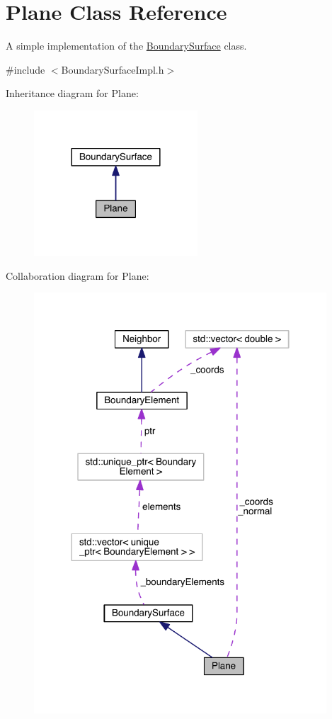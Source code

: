\hypertarget{classPlane}{\section{Plane Class Reference}
\label{classPlane}
}


A simple implementation of the \hyperlink{classBoundarySurface}{Boundary\+Surface} class.  




{\ttfamily \#include $<$Boundary\+Surface\+Impl.\+h$>$}



Inheritance diagram for Plane\+:\nopagebreak
\begin{figure}[H]
\begin{center}
\leavevmode
\includegraphics[width=173pt]{classPlane__inherit__graph}
\end{center}
\end{figure}


Collaboration diagram for Plane\+:\nopagebreak
\begin{figure}[H]
\begin{center}
\leavevmode
\includegraphics[width=310pt]{classPlane__coll__graph}
\end{center}
\end{figure}
